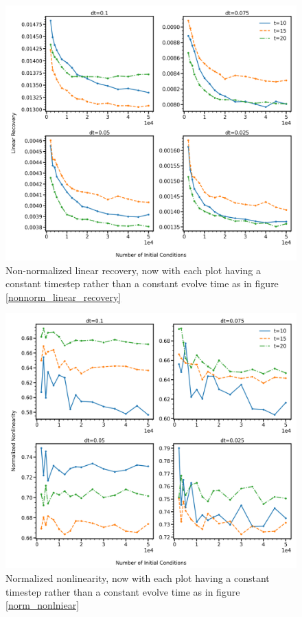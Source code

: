 \documentclass[11pt]{article} %
\numberwithin{equation}{section}  %
\begin{document}
\begin{figure}
	\centering
	
	\includegraphics[width=\linewidth]{figures/nonnorm_linear_recovery_evolve_time}
	\caption{Non-normalized linear recovery, now with each plot having a constant timestep rather than a constant evolve time as in figure \ref{nonnorm_linear_recovery}}\label{nonnorm_linear_recovery_evolve_time}
\end{figure}

\begin{figure}
	\centering
	
	\includegraphics[width=\linewidth]{figures/norm_nonlinearity_evolve_time}
	\caption{Normalized nonlinearity, now with each plot having a constant timestep rather than a constant evolve time as in figure \ref{norm_nonlniear}}\label{norm_nonlinear_evolve_time}
\end{figure}
\end{document}
